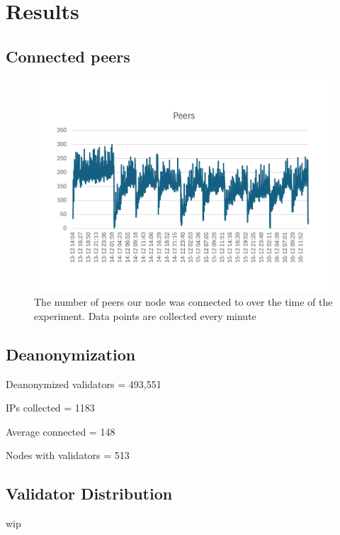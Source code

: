 \section{Results}\label{sec:results}
\subsection{Connected peers}\label{subsec:connected-peers}

\begin{figure}[!ht]
\includegraphics[width=\linewidth]{figures/conPeer2}
\caption{The number of peers our node was connected to over the time of the experiment.
Data points are collected every minute}
\label{fig:peersconnected}
\end{figure}
\subsection{Deanonymization}\label{subsec:deanonymization}
Deanonymized validators = 493,551

IPs collected = 1183

Average connected = 148

Nodes with validators = 513
\subsection{Validator Distribution}\label{subsec:validator-distribution}
wip